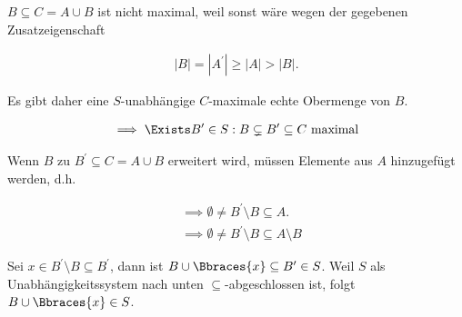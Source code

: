 \begin{solution}
\begin{enumerate}[label = \arabic*.]
    $B \subseteq C = A \cup B$ ist nicht maximal, weil sonst wäre wegen der gegebenen Zusatzeigenschaft

    \begin{align*}
        |B| = |A^\prime| \geq |A| > |B|.
    \end{align*}

    Es gibt daher eine $S$-unabhängige $C$-maximale echte Obermenge von $B$.

    \begin{align*}
        \implies
        \Exists B^\prime \in S:
        B \subsetneq B^\prime \subseteq C ~\text{maximal}
    \end{align*}

    Wenn $B$ zu $B^\prime \subseteq C = A \cup B$ erweitert wird, müssen Elemente aus $A$ hinzugefügt werden, d.h.

    \begin{align*}
        & \implies
        \emptyset \neq B^\prime \setminus B \subseteq A. \\
        & \implies
        \emptyset \neq B^\prime \setminus B \subseteq A \setminus B
    \end{align*}

    Sei $x \in B^\prime \setminus B \subseteq B^\prime$, dann ist $B \cup \Bbraces{x} \subseteq B^\prime \in S$.
    Weil $S$ als Unabhängigkeitssystem nach unten $\subseteq$-abgeschlossen ist, folgt $B \cup \Bbraces{x} \in S$.

\end{enumerate}

\end{solution}

